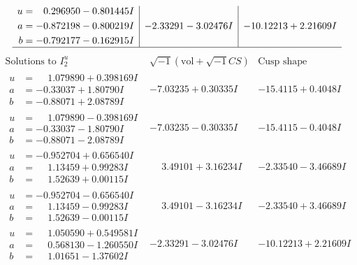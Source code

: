 \documentclass[1p]{elsarticle_modified}
\theoremstyle{definition}
\newcommand{\I}{\sqrt{-1}}
\begin{document}
$$\begin{array}{c|c|c}
\begin{aligned}
u &= \phantom{-}0.296950 - 0.801445 I \\
a &= -0.872198 - 0.800219 I \\
b &= -0.792177 - 0.162915 I\end{aligned}
 & -2.33291 - 3.02476 I & -10.12213 + 2.21609 I\\
 \hline 
 \end{array}$$\newpage$$\begin{array}{c|c|c}  
\text{Solutions to }I^u_{2}& \I (\text{vol} + \sqrt{-1}CS) & \text{Cusp shape}\\
 \hline 
\begin{aligned}
u &= \phantom{-}1.079890 + 0.398169 I \\
a &= -0.33037 + 1.80790 I \\
b &= -0.88071 + 2.08789 I\end{aligned}
 & -7.03235 + 0.30335 I & -15.4115 + 0.4048 I \\ \hline\begin{aligned}
u &= \phantom{-}1.079890 - 0.398169 I \\
a &= -0.33037 - 1.80790 I \\
b &= -0.88071 - 2.08789 I\end{aligned}
 & -7.03235 - 0.30335 I & -15.4115 - 0.4048 I \\ \hline\begin{aligned}
u &= -0.952704 + 0.656540 I \\
a &= \phantom{-}1.13459 + 0.99283 I \\
b &= \phantom{-}1.52639 + 0.00115 I\end{aligned}
 & \phantom{-}3.49101 + 3.16234 I & -2.33540 - 3.46689 I \\ \hline\begin{aligned}
u &= -0.952704 - 0.656540 I \\
a &= \phantom{-}1.13459 - 0.99283 I \\
b &= \phantom{-}1.52639 - 0.00115 I\end{aligned}
 & \phantom{-}3.49101 - 3.16234 I & -2.33540 + 3.46689 I \\ \hline\begin{aligned}
u &= \phantom{-}1.050590 + 0.549581 I \\
a &= \phantom{-}0.568130 - 1.260550 I \\
b &= \phantom{-}1.01651 - 1.37602 I\end{aligned}
 & -2.33291 - 3.02476 I & -10.12213 + 2.21609 I \\ \hline\begin{aligned}

\end{aligned}
\end{array}$$
\end{document}
